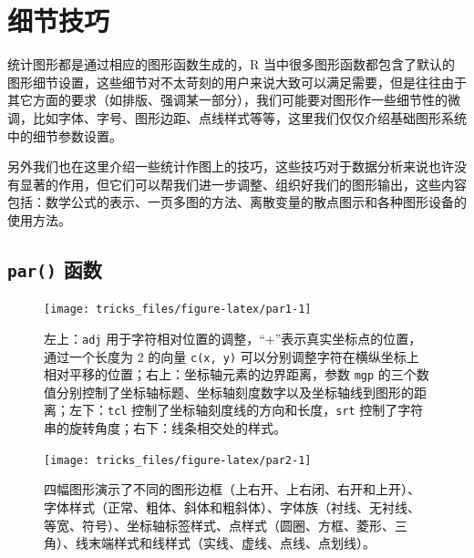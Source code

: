 \documentclass[
  b5paper,
  UTF8,twoside]{book}
\begin{document}
\chapter{细节技巧}\label{cha:tricks}

统计图形都是通过相应的图形函数生成的，R 当中很多图形函数都包含了默认的图形细节设置，这些细节对不太苛刻的用户来说大致可以满足需要，但是往往由于其它方面的要求（如排版、强调某一部分），我们可能要对图形作一些细节性的微调，比如字体、字号、图形边距、点线样式等等，这里我们仅仅介绍基础图形系统中的细节参数设置。

另外我们也在这里介绍一些统计作图上的技巧，这些技巧对于数据分析来说也许没有显著的作用，但它们可以帮我们进一步调整、组织好我们的图形输出，这些内容包括：数学公式的表示、一页多图的方法、离散变量的散点图示和各种图形设备的使用方法。

\section{\texorpdfstring{\texttt{par()} 函数}{par() 函数}}\label{sec:par}

\begin{figure}

{\centering \texttt{[image: tricks\_files/figure-latex/par1-1]} 

}

\caption[参数 \texttt{adj}、\texttt{mgp}、\texttt{tcl} 和 \texttt{ljoin} 设置演示]{左上：\texttt{adj} 用于字符相对位置的调整，``+''表示真实坐标点的位置，通过一个长度为 2 的向量 \texttt{c(x,\ y)} 可以分别调整字符在横纵坐标上相对平移的位置；右上：坐标轴元素的边界距离，参数 \texttt{mgp} 的三个数值分别控制了坐标轴标题、坐标轴刻度数字以及坐标轴线到图形的距离；左下：\texttt{tcl} 控制了坐标轴刻度线的方向和长度，\texttt{srt} 控制了字符串的旋转角度；右下：线条相交处的样式。}\label{fig:par1}
\end{figure}





\begin{figure}

{\centering \texttt{[image: tricks\_files/figure-latex/par2-1]} 

}

\caption[其它主要参数的效果演示：\texttt{bty}，\texttt{font}，\texttt{las}，\texttt{family} 等]{四幅图形演示了不同的图形边框（上右开、上右闭、右开和上开）、字体样式（正常、粗体、斜体和粗斜体）、字体族（衬线、无衬线、等宽、符号）、坐标轴标签样式、点样式（圆圈、方框、菱形、三角）、线末端样式和线样式（实线、虚线、点线、点划线）。}\label{fig:par2}
\end{figure}
\end{document}
